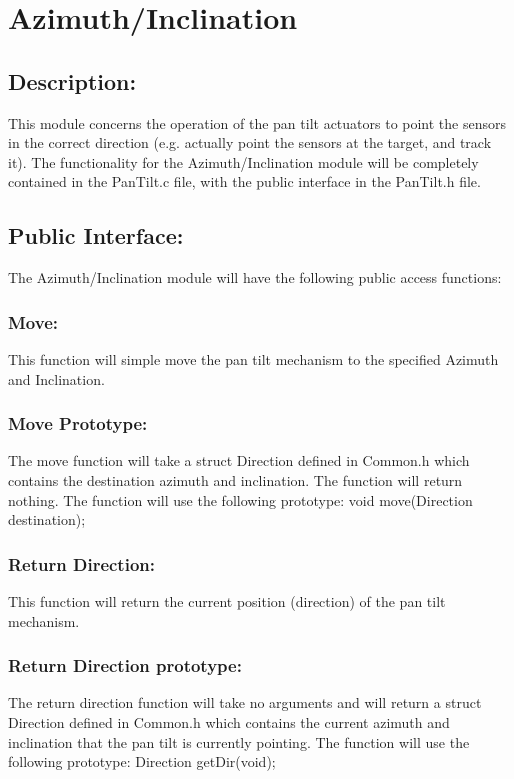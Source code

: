 \documentclass[]{article}
\begin{document}
\newpage
\section{Azimuth/Inclination}

\subsection{Description:}
This module concerns the operation of the pan tilt actuators to point the sensors in the correct direction (e.g. actually point the sensors at the target, and track it). The functionality for the Azimuth/Inclination module will be completely contained in the PanTilt.c file, with the public interface in the PanTilt.h file.

\subsection{Public Interface:}
The Azimuth/Inclination module will have the following public access functions:

\subsubsection{Move:}
This function will simple move the pan tilt mechanism to the specified Azimuth and Inclination.

\subsubsection{Move Prototype:}
The move function will take a struct Direction defined in Common.h which contains the destination azimuth and inclination. The function will return nothing. The function will use the following prototype: \newline \newline 
void move(Direction destination);

\subsubsection{Return Direction:}
This function will return the current position (direction) of the pan tilt mechanism.

\subsubsection{Return Direction prototype:}
The return direction function will take no arguments and will return a struct Direction defined in Common.h which contains the current azimuth and inclination that the pan tilt is currently pointing. The function will use the following prototype: \newline \newline
Direction getDir(void);
\end{document}
